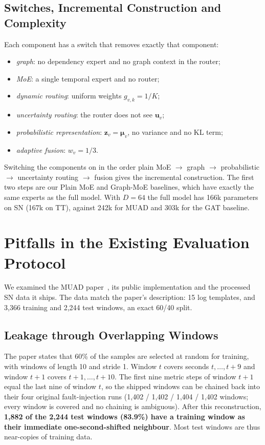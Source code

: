 \documentclass[journal]{IEEEtran}
\begin{document}
\subsection{Switches, Incremental Construction and Complexity}
Each component has a switch that removes exactly that component:
\begin{itemize}
  \item \emph{graph}: no dependency expert and no graph context in the router;
  \item \emph{MoE}: a single temporal expert and no router;
  \item \emph{dynamic routing}: uniform weights $g_{v,k}=1/K$;
  \item \emph{uncertainty routing}: the router does not see $\bm{u}_v$;
  \item \emph{probabilistic representation}: $\bm{z}_v=\bm{\mu}_v$, no variance and no KL term;
  \item \emph{adaptive fusion}: $w_v=1/3$.
\end{itemize}
Switching the components on in the order plain MoE $\rightarrow$ graph $\rightarrow$ probabilistic
$\rightarrow$ uncertainty routing $\rightarrow$ fusion gives the incremental construction. The first two
steps are our Plain MoE and Graph-MoE baselines, which have exactly the same experts as the full model.
With $D=64$ the full model has 166k parameters on SN (167k on TT), against 242k for MUAD and 303k for the GAT
baseline.

\section{Pitfalls in the Existing Evaluation Protocol}
\label{sec:pitfalls}

We examined the MUAD paper~\cite{dou2026muad}, its public implementation and the processed SN data it
ships. The data match the paper's description: 15 log templates, and 3,366 training and 2,244 test windows,
an exact 60/40 split.

\subsection{Leakage through Overlapping Windows}
The paper states that 60\% of the samples are selected at random for training, with windows of length 10
and stride 1. Window $t$ covers seconds $t,\dots,t+9$ and window $t+1$ covers $t+1,\dots,t+10$. The first nine
metric steps of window $t+1$ equal the last nine of window $t$, so the shipped windows can be chained back
into their four original fault-injection runs (1,402 / 1,402 / 1,404 / 1,402 windows; every window is
covered and no chaining is ambiguous). After this reconstruction, \textbf{1,882 of the 2,244 test windows
(83.9\%) have a training window as their immediate one-second-shifted neighbour}. Most test windows are thus
near-copies of training data.
\end{document}
